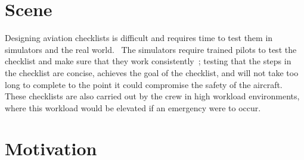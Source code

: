 \documentclass[../dissertation.tex]{subfiles}
\begin{document}
\section{Scene}

Designing aviation checklists is difficult and requires time to test them
in simulators and the real world.~\cite{nasa:design}
The simulators require trained pilots to test the checklist and make sure that they
work consistently~\cite{manifesto}; testing that the steps in the checklist
are concise, achieves the goal of the checklist, and will not take too
long to complete to the point it could compromise the safety of the aircraft.
These checklists are also carried out by the crew in high workload environments,
where this workload would be elevated if an emergency were to occur.~\cite{caa:emergency}

\section{Motivation}
\end{document}
